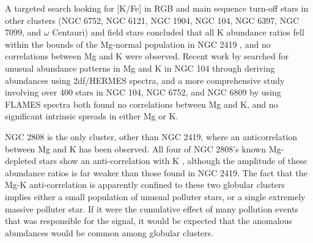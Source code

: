 \documentclass[a4paper,fleqn,usenatbib]{mnras}
\begin{document}
A targeted search looking for [K/Fe] in RGB and main sequence turn-off stars in other clusters (NGC 6752, NGC 6121, NGC 1904, NGC 104, NGC 6397, NGC 7099, and $\omega$ Centauri) and field stars concluded that all K abundance ratios fell within the bounds of the Mg-normal population in NGC 2419 \citep{carretta2013}, and no correlations between Mg and K were observed. Recent work by \cite{cerniauskas201747tuc} searched for unusual abundance patterns in Mg and K in NGC 104 through deriving abundances using 2df/HERMES spectra, and a more comprehensive study involving over 400 stars in NGC 104, NGC 6752, and NGC 6809 by \cite{mucciarelli2017K} using FLAMES spectra \citep{cerniauskas201747tuc} both found no correlations between Mg and K, and no significant intrinsic spreads in either Mg or K.

NGC 2808 is the only cluster, other than NGC 2419, where an anticorrelation between Mg and K has been observed. All four of NGC 2808's known Mg-depleted stars show an anti-correlation with K \citep{mucciarelli2015}, although the amplitude of these abundance ratios is far weaker than those found in NGC 2419. The fact that the Mg-K anti-correlation is apparently confined to these two globular clusters implies either a small population of unusual polluter stars, or a single extremely massive polluter star. If it were the cumulative effect of many pollution events that was responsible for the signal, it would be expected that the anomalous abundances would be common among globular clusters.





\end{document}
